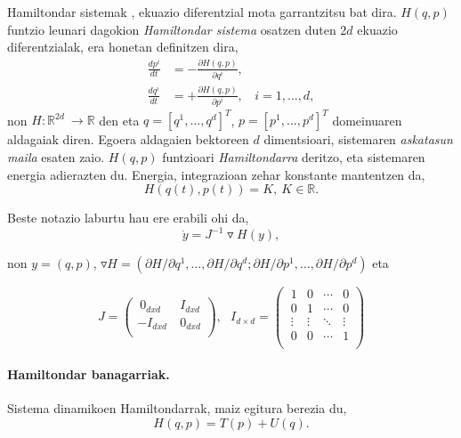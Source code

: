  
Hamiltondar sistemak \cite{SSerna2015}, ekuazio diferentzial mota garrantzitsu bat dira. $H(q,p)$ funtzio leunari dagokion \emph{Hamiltondar sistema} osatzen duten $2d$ ekuazio diferentzialak, era honetan definitzen dira,
\begin{align*}
\label{eq:212}
\frac{d {p}^i}{dt} & =-\frac{\partial H (q,p)}{\partial q^i} , \\
\frac{d {q}^i}{dt} & =+\frac{\partial H (q,p)}{\partial p^i} , \ \ \ \ i=1,\dots,d,
\end{align*}
non $H: {\mathbb{R}}^{2d} \ \longrightarrow {\mathbb{R}}$  den eta  $q=[q^1, \dots , q^d]^T$, $p=[p^1, \dots , p^d]^T$  domeinuaren aldagaiak diren. Egoera aldagaien bektoreen $d$ dimentsioari, sistemaren \emph{askatasun maila} esaten zaio. $H(q,p)$ funtzioari \emph{Hamiltondarra} deritzo, eta sistemaren energia adierazten du. Energia, integrazioan zehar konstante mantentzen da,
\begin{equation*}
\label{eq:212b}
H(q(t),p(t))=K, \ K \in \mathbb{R}.
\end{equation*}

Beste notazio laburtu hau ere erabili ohi da,
\begin{equation*}
 \label{eq:213}
\dot{y}=J^{-1}\triangledown H(y),
\end{equation*}

non $y=(q,p)$, $\triangledown H=(\partial H/\partial q^1,\dots,\partial H/\partial q^d; \partial H/\partial p^1,\dots,\partial H/\partial p^d)$ eta

\begin{equation*}
 J=\left(\begin{array}{cc}
   \ 0_{dxd} & \ I_{dxd} \\
    -I_{dxd} & \ 0_{dxd} \\
\end{array}\right), \ \ \ 
I_{d \times d}=\left(\begin{array}{cccc}
   \ 1       & 0      & \cdots & 0 \\
   \ 0       & 1      & \cdots & 0 \\
   \ \vdots  & \vdots & \ddots & \vdots \\
   \ 0       & 0 & \cdots & 1 \\
\end{array}\right)  
\end{equation*}


\paragraph*{Hamiltondar banagarriak.} Sistema dinamikoen Hamiltondarrak, maiz egitura berezia du,
\begin{equation*}
H({q},{p})=T(p)+U({q}).
\end{equation*} 

